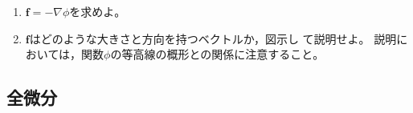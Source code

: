 \documentclass[twocolumn,11pt]{jarticle}
\begin{document}
\begin{enumerate}
\item $\boldsymbol{f}=-\nabla\phi$を求めよ。
\item $\boldsymbol{f}$はどのような大きさと方向を持つベクトルか，図示し
  て説明せよ。
  説明においては，関数$\phi$の等高線の概形との関係に注意すること。 
\end{enumerate}

%
%

\subsection{全微分}
\end{document}
